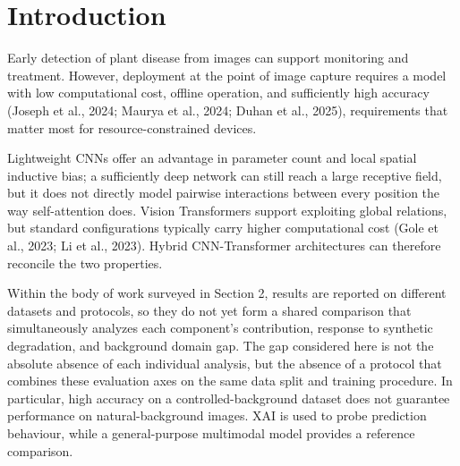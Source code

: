 \FloatBarrier

\section{Introduction}\label{introduction}

Early detection of plant disease from images can support monitoring and treatment. However, deployment at the point of image capture requires a model with low computational cost, offline operation, and sufficiently high accuracy (Joseph et al., 2024; Maurya et al., 2024; Duhan et al., 2025), requirements that matter most for resource-constrained devices.

Lightweight CNNs offer an advantage in parameter count and local spatial inductive bias; a sufficiently deep network can still reach a large receptive field, but it does not directly model pairwise interactions between every position the way self-attention does. Vision Transformers support exploiting global relations, but standard configurations typically carry higher computational cost (Gole et al., 2023; Li et al., 2023). Hybrid CNN-Transformer architectures can therefore reconcile the two properties.

Within the body of work surveyed in Section 2, results are reported on different datasets and protocols, so they do not yet form a shared comparison that simultaneously analyzes each component's contribution, response to synthetic degradation, and background domain gap. The gap considered here is not the absolute absence of each individual analysis, but the absence of a protocol that combines these evaluation axes on the same data split and training procedure. In particular, high accuracy on a controlled-background dataset does not guarantee performance on natural-background images. XAI is used to probe prediction behaviour, while a general-purpose multimodal model provides a reference comparison.

